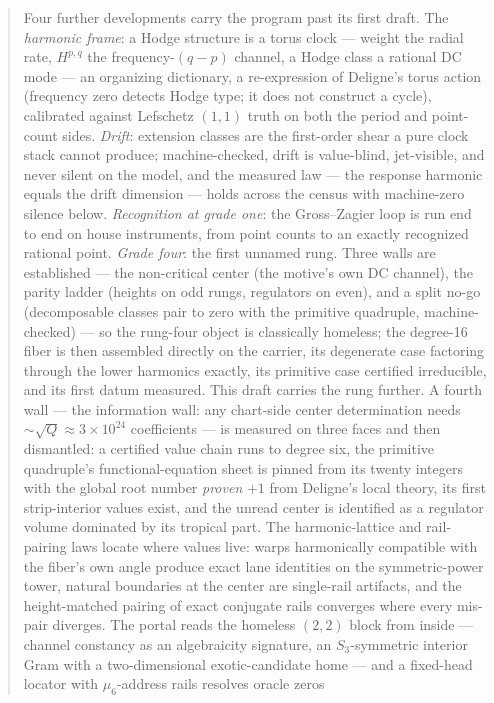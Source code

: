\documentclass[11pt]{article}
\theoremstyle{definition}
\theoremstyle{remark}
\begin{document}
\begin{abstract}
Four further developments carry the program past its first draft. The
\emph{harmonic frame}: a Hodge structure is a torus clock --- weight the radial
rate, $H^{p,q}$ the frequency-$(q{-}p)$ channel, a Hodge class a rational DC
mode --- an organizing dictionary, a re-expression of Deligne's torus action
(frequency zero detects Hodge type; it does not construct a cycle), calibrated
against Lefschetz $(1,1)$ truth on both the period and point-count sides. \emph{Drift}: extension classes are the first-order shear a
pure clock stack cannot produce; machine-checked, drift is value-blind,
jet-visible, and never silent on the model, and the measured law --- the
response harmonic equals the drift dimension --- holds across the census with
machine-zero silence below. \emph{Recognition at grade one}: the
Gross--Zagier loop is run end to end on house instruments, from point counts to
an exactly recognized rational point. \emph{Grade four}: the first unnamed
rung. Three walls are established --- the non-critical center (the motive's own
DC channel), the parity ladder (heights on odd rungs, regulators on even), and
a split no-go (decomposable classes pair to zero with the primitive quadruple,
machine-checked) --- so the rung-four object is classically homeless; the
degree-16 fiber is then assembled directly on the carrier, its degenerate case
factoring through the lower harmonics exactly, its primitive case certified
irreducible, and its first datum measured. This draft carries the rung further.
A fourth wall --- the information wall: any chart-side center determination
needs $\sim\!\sqrt Q\approx3\times10^{24}$ coefficients --- is measured on
three faces and then dismantled: a certified value chain runs to degree six,
the primitive quadruple's functional-equation sheet is pinned from its twenty
integers with the global root number \emph{proven} $+1$ from Deligne's local
theory, its first strip-interior values exist, and the unread center is
identified as a regulator volume dominated by its tropical part. The
harmonic-lattice and rail-pairing laws locate where values live: warps
harmonically compatible with the fiber's own angle produce exact lane
identities on the symmetric-power tower, natural boundaries at the center are
single-rail artifacts, and the height-matched pairing of exact conjugate rails
converges where every mis-pair diverges. The portal reads the homeless
$(2,2)$ block from inside --- channel constancy as an algebraicity signature,
an $S_3$-symmetric interior Gram with a two-dimensional exotic-candidate home
--- and a fixed-head locator with $\mu_6$-address rails resolves oracle zeros

\end{abstract}
\end{document}
